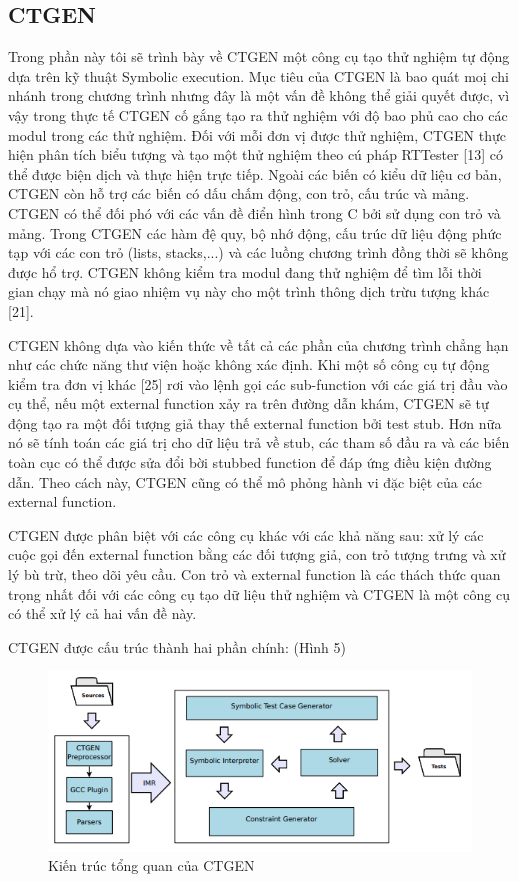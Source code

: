 \documentclass[12pt,a4paper]{article}
\begin{document}
\subsection{CTGEN}
Trong phần này tôi sẽ trình bày về CTGEN một công cụ tạo thử nghiệm tự động dựa trên kỹ thuật Symbolic execution. Mục tiêu của CTGEN là bao quát moị chi nhánh trong chương trình nhưng đây là một vấn đề không thể giải quyết được, vì vậy trong thực tế CTGEN cố gắng tạo ra thử nghiệm với độ bao phủ cao cho các modul trong các thử nghiệm. Đối với mỗi đơn vị được thử nghiệm, CTGEN thực hiện phân tích biểu tượng và tạo một thử nghiệm theo cú pháp RTTester [13] có thể được biện dịch và thực hiện trực tiếp. Ngoài các biến có kiểu dữ liệu cơ bản, CTGEN còn hỗ trợ các biến có dấu chấm động, con trỏ, cấu trúc và mảng. CTGEN có thể đối phó với các vấn đề điển hình trong C bởi sử dụng con trỏ và mảng. Trong CTGEN các hàm đệ quy, bộ nhớ động, cấu trúc dữ liệu động phức tạp với các con trỏ (lists, stacks,...) và các luồng chương trình đồng thời sẽ không được hổ trợ. CTGEN không kiểm tra modul đang thử nghiệm để tìm lỗi thời gian chạy mà nó giao nhiệm vụ này cho một trình thông dịch trừu tượng khác [21].

\indent CTGEN không dựa vào kiến thức về tất cả các phần của chương trình chẳng hạn như các chức năng thư viện hoặc không xác định. Khi một số công cụ tự động kiểm tra đơn vị khác [25] rơi vào lệnh gọi các sub-function với các giá trị đầu vào cụ thể, nếu một external function xảy ra trên đường dẫn khám, CTGEN sẽ tự động tạo ra một đối tượng giả thay thế external function bởi test stub. Hơn nữa nó sẽ tính toán các giá trị cho dữ liệu trả về stub, các tham số đầu ra và các biến toàn cục có thể được sửa đổi bời stubbed function để đáp ứng điều kiện đường dẫn. Theo cách này, CTGEN cũng có thể mô phỏng hành vi đặc biệt của các external function.

\indent CTGEN được phân biệt với các công cụ khác với các khả năng sau: xử lý các cuộc gọi đến external function bằng các đối tượng giả, con trỏ tượng trưng và xử lý bù trừ, theo dõi yêu cầu. Con trỏ và external function là các thách thức quan trọng nhất đối với các công cụ tạo dữ liệu thử nghiệm và CTGEN là một công cụ có thể xử lý cả hai vấn đề này.

\indent CTGEN được cấu trúc thành hai phần chính: (Hình 5)

\begin{figure}[ht]
\begin{center}
\includegraphics{hinhanh/hinh5}
\end{center}
\caption{Kiến trúc tổng quan của CTGEN}
\end{figure}
\end{document}

